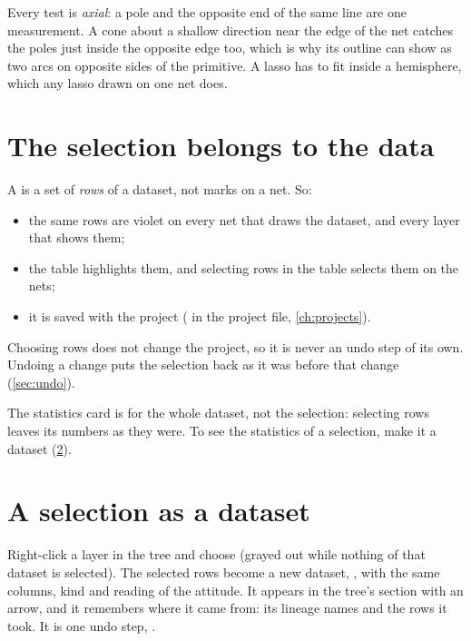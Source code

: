 Every test is \emph{axial}: a pole and the opposite end of the same line are one measurement. A cone about
a shallow direction near the edge of the net catches the poles just inside the opposite edge too, which
is why its outline can show as two arcs on opposite sides of the primitive. A lasso has to fit inside a
hemisphere, which any lasso drawn on one net does.

\section{The selection belongs to the data}\label{sec:select-data}

A  is a set of \emph{rows} of a dataset, not marks on a net. So:

\begin{itemize}
\item the same rows are violet on every net that draws the dataset, and every layer that shows them;
\item the table highlights them, and selecting rows in the table selects them on the nets;
\item it is saved with the project ( in the project file, \cref{ch:projects}).
\end{itemize}

Choosing rows does not change the project, so it is never an undo step of its own. Undoing a change puts
the selection back as it was before that change (\cref{sec:undo}).

\begin{note}
The statistics card is for the whole dataset, not the selection: selecting rows leaves its numbers as
they were. To see the statistics of a selection, make it a dataset (\cref{sec:select-dataset}).
\end{note}

\section{A selection as a dataset}\label{sec:select-dataset}

Right-click a layer in the tree and choose  (grayed out while nothing of that
dataset is selected). The selected rows become a new dataset, , with the same
columns, kind and reading of the attitude. It appears in the tree's  section with an arrow, and
it remembers where it came from: its lineage names  and the rows it took. It is one undo step,
.

